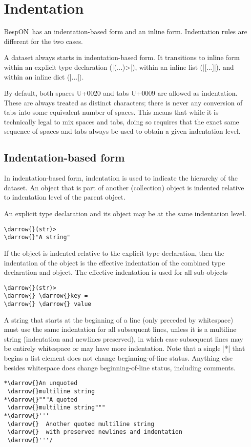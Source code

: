 \documentclass[11pt]{article}
\newcommand{\bespon}{BespON}
\newcommand{\darrow}{\ensuremath{\textcolor{DarkGreen}{\downarrow}}}
\begin{document}
\section{Indentation}
\label{sec:indentation}

\bespon\ has an indentation-based form and an inline form.  Indentation rules are different for the two cases.

A dataset always starts in indentation-based form.  It transitions to inline form within an explicit type declaration (|(...)>|), within an inline list (|[...]|), and within an inline dict (|{...}|).

By default, both spaces U+0020 and tabs U+0009 are allowed as indentation.  These are always treated as distinct characters; there is never any conversion of tabs into some equivalent number of spaces.  This means that while it is technically legal to mix spaces and tabs, doing so requires that the exact same sequence of spaces and tabs always be used to obtain a given indentation level.


\subsection{Indentation-based form}

In indentation-based form, indentation is used to indicate the hierarchy of the dataset.  An object that is part of another (collection) object is indented relative to indentation level of the parent object.

An explicit type declaration and its object may be at the same indentation level.
\begin{Verbatim}[commandchars=\\\{\}]
\darrow{}(str)>
\darrow{}"A string"
\end{Verbatim}
If the object is indented relative to the explicit type declaration, then the indentation of the object is the effective indentation of the combined type declaration and object.  The effective indentation is used for all sub-objects
\begin{Verbatim}[commandchars=\\\{\}]
\darrow{}(str)>
\darrow{} \darrow{}key = 
\darrow{} \darrow{} value
\end{Verbatim}

A string that starts at the beginning of a line (only preceded by whitespace) must use the same indentation for all subsequent lines, unless it is a multiline string (indentation and newlines preserved), in which case subsequent lines may be entirely whitespace or may have more indentation.  Note that a single |*| that begins a list element does not change beginning-of-line status.  Anything else besides whitespace does change beginning-of-line status, including comments. 
\begin{Verbatim}[commandchars=\\\{\}]
*\darrow{}An unquoted
 \darrow{}multiline string
*\darrow{}"""A quoted
 \darrow{}multiline string"""
*\darrow{}'''
 \darrow{}  Another quoted multiline string
 \darrow{}  with preserved newlines and indentation
 \darrow{}'''/
\end{Verbatim}
\end{document}
